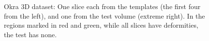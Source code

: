 \documentclass{article}
\begin{document}
\begin{figure}[!h]
\begin{subfigure}[b]{0.19\linewidth}
\captionsetup{labelformat=empty}
        \caption{}
     \end{subfigure}
    \begin{subfigure}[b]{0.186\linewidth}
\captionsetup{labelformat=empty}
        \caption{}
     \end{subfigure}
     \caption[Okra 3D dataset]{Okra 3D dataset: One slice each from the templates (the
       first four from the left), and one from the test volume
       (extreme right). In the regions marked in red and green, while
       all slices have deformities, the test
       has none.}
\label{fig:templates_test_okra}
\end{figure}
\end{document}
